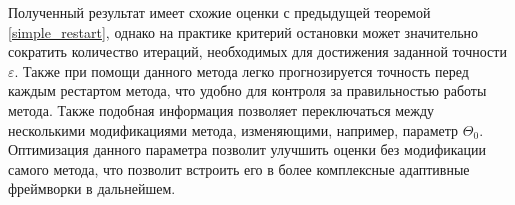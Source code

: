     Полученный результат имеет схожие оценки с предыдущей теоремой \ref{simple_restart}, однако на практике критерий остановки может значительно сократить количество итераций, необходимых для достижения заданной точности $\varepsilon$. Также при помощи данного метода легко прогнозируется точность перед каждым рестартом метода, что удобно для контроля за правильностью работы метода. Также подобная информация позволяет переключаться между несколькими модификациями метода, изменяющими, например, параметр $\Theta_0$. Оптимизация данного параметра позволит улучшить оценки без модификации самого метода, что позволит встроить его в более комплексные адаптивные фреймворки в дальнейшем. 
\FloatBarrier